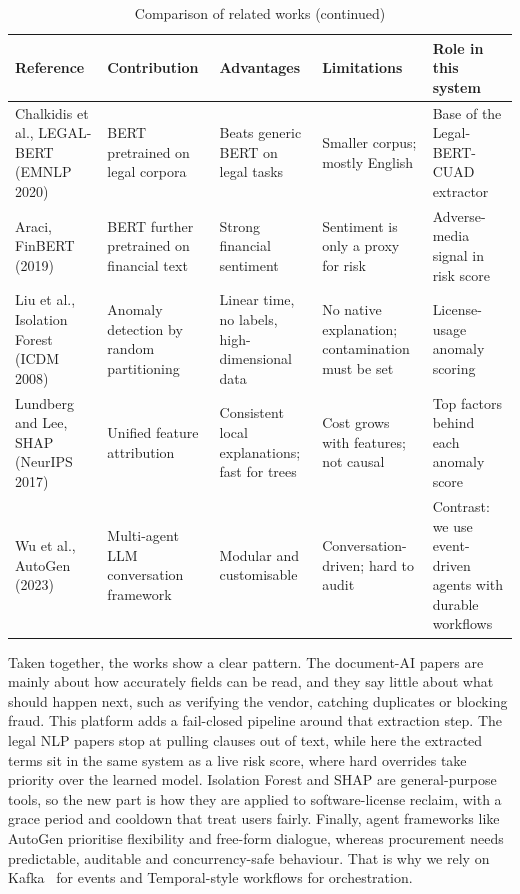 \begin{table}[!htbp]
\centering
\footnotesize
\sloppy
\renewcommand{\arraystretch}{1.2}
\caption{Comparison of related works (continued)}
\begin{tabular}{|p{}|p{}|p{}|p{}|p{}|}
\hline
\raggedright \textbf{Reference} & \raggedright \textbf{Contribution} & \raggedright \textbf{Advantages} & \raggedright \textbf{Limitations} & \raggedright \textbf{Role in this system} \tabularnewline \hline
\raggedright Chalkidis et al., LEGAL-BERT (EMNLP 2020) \cite{chalkidis2020legalbert} & \raggedright BERT pretrained on legal corpora & \raggedright Beats generic BERT on legal tasks & \raggedright Smaller corpus; mostly English & \raggedright Base of the Legal-BERT-CUAD extractor \tabularnewline \hline
\raggedright Araci, FinBERT (2019) \cite{araci2019finbert} & \raggedright BERT further pretrained on financial text & \raggedright Strong financial sentiment & \raggedright Sentiment is only a proxy for risk & \raggedright Adverse-media signal in risk score \tabularnewline \hline
\raggedright Liu et al., Isolation Forest (ICDM 2008) \cite{liu2008isolation} & \raggedright Anomaly detection by random partitioning & \raggedright Linear time, no labels, high-dimensional data & \raggedright No native explanation; contamination must be set & \raggedright License-usage anomaly scoring \tabularnewline \hline
\raggedright Lundberg and Lee, SHAP (NeurIPS 2017) \cite{lundberg2017shap} & \raggedright Unified feature attribution & \raggedright Consistent local explanations; fast for trees & \raggedright Cost grows with features; not causal & \raggedright Top factors behind each anomaly score \tabularnewline \hline
\raggedright Wu et al., AutoGen (2023) \cite{wu2023autogen} & \raggedright Multi-agent LLM conversation framework & \raggedright Modular and customisable & \raggedright Conversation-driven; hard to audit & \raggedright Contrast: we use event-driven agents with durable workflows \tabularnewline \hline
\end{tabular}
\end{table}


Taken together, the works show a clear pattern. The document-AI papers are mainly about how accurately fields can be read, and they say little about what should happen next, such as verifying the vendor, catching duplicates or blocking fraud. This platform adds a fail-closed pipeline around that extraction step. The legal NLP papers stop at pulling clauses out of text, while here the extracted terms sit in the same system as a live risk score, where hard overrides take priority over the learned model. Isolation Forest and SHAP are general-purpose tools, so the new part is how they are applied to software-license reclaim, with a grace period and cooldown that treat users fairly. Finally, agent frameworks like AutoGen prioritise flexibility and free-form dialogue, whereas procurement needs predictable, auditable and concurrency-safe behaviour. That is why we rely on Kafka~\cite{kreps2011kafka} for events and Temporal-style workflows for orchestration.

